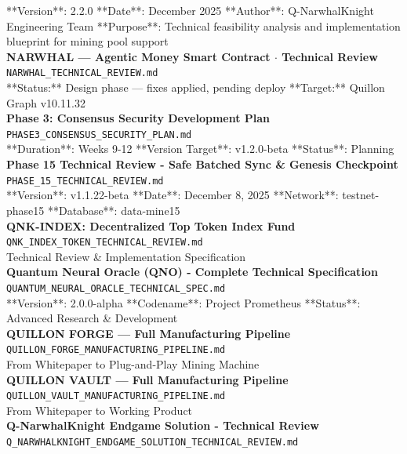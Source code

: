 \documentclass[11pt,a4paper]{article}
\begin{document}
**Version**: 2.2.0 **Date**: December 2025 **Author**: Q-NarwhalKnight Engineering Team **Purpose**: Technical feasibility analysis and implementation blueprint for mining pool support\\[6pt]
\noindent\textbf{NARWHAL --- Agentic Money Smart Contract $\cdot$ Technical Review}\,\textcolor{qgray}{\small \texttt{NARWHAL\_TECHNICAL\_REVIEW.md}}\\
**Status:** Design phase --- fixes applied, pending deploy **Target:** Quillon Graph v10.11.32\\[6pt]
\noindent\textbf{Phase 3: Consensus Security Development Plan}\,\textcolor{qgray}{\small \texttt{PHASE3\_CONSENSUS\_SECURITY\_PLAN.md}}\\
**Duration**: Weeks 9-12 **Version Target**: v1.2.0-beta **Status**: Planning\\[6pt]
\noindent\textbf{Phase 15 Technical Review - Safe Batched Sync \& Genesis Checkpoint}\,\textcolor{qgray}{\small \texttt{PHASE\_15\_TECHNICAL\_REVIEW.md}}\\
**Version**: v1.1.22-beta **Date**: December 8, 2025 **Network**: testnet-phase15 **Database**: data-mine15\\[6pt]
\noindent\textbf{QNK-INDEX: Decentralized Top Token Index Fund}\,\textcolor{qgray}{\small \texttt{QNK\_INDEX\_TOKEN\_TECHNICAL\_REVIEW.md}}\\
Technical Review \& Implementation Specification\\[6pt]
\noindent\textbf{Quantum Neural Oracle (QNO) - Complete Technical Specification}\,\textcolor{qgray}{\small \texttt{QUANTUM\_NEURAL\_ORACLE\_TECHNICAL\_SPEC.md}}\\
**Version**: 2.0.0-alpha **Codename**: Project Prometheus **Status**: Advanced Research \& Development\\[6pt]
\noindent\textbf{QUILLON FORGE --- Full Manufacturing Pipeline}\,\textcolor{qgray}{\small \texttt{QUILLON\_FORGE\_MANUFACTURING\_PIPELINE.md}}\\
From Whitepaper to Plug-and-Play Mining Machine\\[6pt]
\noindent\textbf{QUILLON VAULT --- Full Manufacturing Pipeline}\,\textcolor{qgray}{\small \texttt{QUILLON\_VAULT\_MANUFACTURING\_PIPELINE.md}}\\
From Whitepaper to Working Product\\[6pt]
\noindent\textbf{Q-NarwhalKnight Endgame Solution - Technical Review}\,\textcolor{qgray}{\small \texttt{Q\_NARWHALKNIGHT\_ENDGAME\_SOLUTION\_TECHNICAL\_REVIEW.md}}\\
\end{document}
